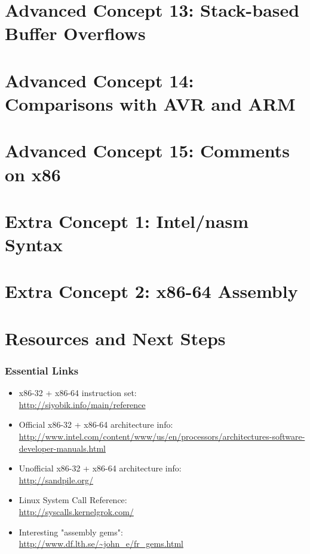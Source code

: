 \documentclass[11pt,xcolor=dvipsnames]{beamer}
\begin{document}
\section{Advanced Concept 13: Stack-based Buffer Overflows}

\section{Advanced Concept 14: Comparisons with AVR and ARM}

\section{Advanced Concept 15: Comments on x86}

\section{Extra Concept 1: Intel/nasm Syntax}

\section{Extra Concept 2: x86-64 Assembly}

\section{Resources and Next Steps}

\begin{frame}[fragile,t]
\frametitle{Essential Links}
\begin{itemize}
  \item x86-32 + x86-64 instruction set: \\ \url{http://siyobik.info/main/reference}
  \item Official x86-32 + x86-64 architecture info: \\ \url{http://www.intel.com/content/www/us/en/processors/architectures-software-developer-manuals.html}
  \item Unofficial x86-32 + x86-64 architecture info: \\ \url{http://sandpile.org/}
  \item Linux System Call Reference: \\ \url{http://syscalls.kernelgrok.com/}
  \item Interesting "assembly gems": \\ \url{http://www.df.lth.se/~john\_e/fr\_gems.html}
\end{itemize}
\end{frame}
\end{document}
